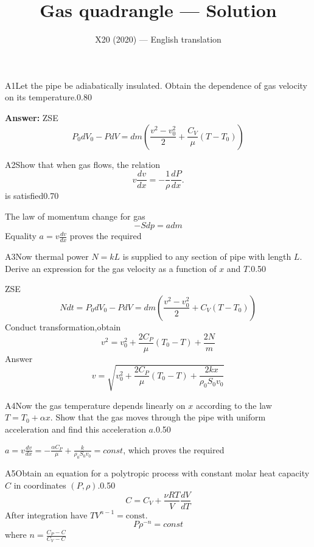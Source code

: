 \documentclass[11pt,a4paper]{article}
\title{\textbf{Gas quadrangle --- Solution}}
\author{\normalsize X20 (2020) — English translation}
\date{}
\begin{document}
\maketitle\vspace{-0.5em}
\begin{solcard}{A1}{Let the pipe be adiabatically insulated. Obtain the dependence of gas velocity on its temperature.}{0.80}
\par\smallskip\noindent\textbf{Answer:} ZSE $$P_0 dV_0-PdV=dm\left(\frac{v^2-v_0^2}{2}+\frac{C_V}{\mu}(T-T_0)\right)$$
\end{solcard}

\begin{solcard}{A2}{Show that when gas flows, the relation $$v\frac{dv}{dx}=-\frac{1}{\rho}\frac{dP}{dx}.$$ is satisfied}{0.70}

The law of momentum change for gas $$-Sdp=adm$$ Equality $a=v\frac{dv}{dx}$ proves the required

\end{solcard}

\begin{solcard}{A3}{Now thermal power $N=kL$ is supplied to any section of pipe with length $L$. Derive an expression for the gas velocity as a function of $x$ and $T$.}{0.50}

ZSE $$Ndt=P_0dV_0-PdV=dm(\frac{v^2-v_0^2}{2}+C_V(T-T_0))$$ Conduct transformation,obtain $$v^2=v_0^2+\frac{2C_P}{\mu}(T_0-T)+\frac{2N}{m}$$ Answer$$
v=\sqrt{v_0^2+\frac{2C_P}{\mu}(T_0-T)+\frac{2kx}{\rho_0S_0v_0}}$$

\end{solcard}

\begin{solcard}{A4}{Now the gas temperature depends linearly on $x$ according to the law $T=T_0+\alpha x$. Show that the gas moves through the pipe with uniform acceleration and find this acceleration $a$.}{0.50}

$a=v\frac{dv}{dx}=-\frac{\alpha C_P}{\mu}+\frac{k}{\rho_0S_0v_0}=const$, which proves the required

\end{solcard}

\begin{solcard}{A5}{Obtain an equation for a polytropic process with constant molar heat capacity $C$ in coordinates $(P, \rho)$.}{0.50}$$
C={C_V}+\frac{\nu RT}{V} \frac{dV}{dT}

 $$ After integration have $TV^{n-1}=\text{const}$. $$
P\rho^{-n}=const

 $$ where $n=\frac{C_P - C}{C_V - C}$

\end{solcard}
\end{document}
